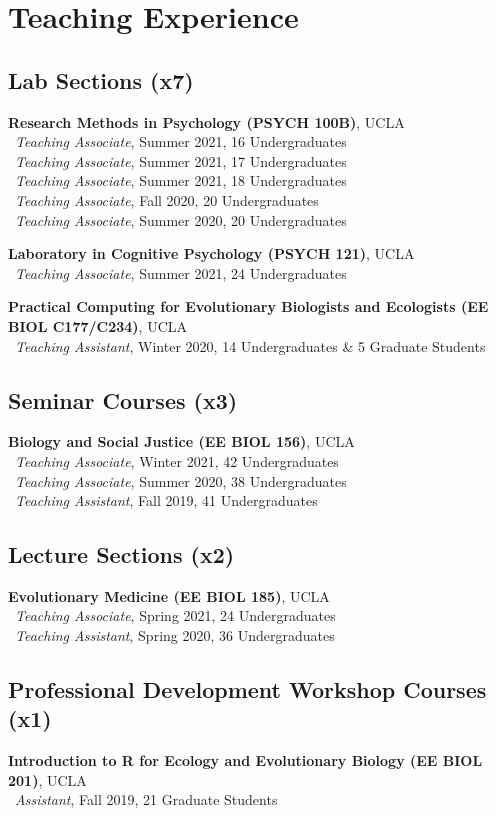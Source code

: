 \section*{Teaching Experience}
\subsection*{Lab Sections (x7)}
\textbf{Research Methods in Psychology (PSYCH 100B)}, UCLA\\
\textendash\ \textit{Teaching Associate}, Summer 2021, 16 Undergraduates\\
\textendash\ \textit{Teaching Associate}, Summer 2021, 17 Undergraduates\\
\textendash\ \textit{Teaching Associate}, Summer 2021, 18 Undergraduates\\
\textendash\ \textit{Teaching Associate}, Fall 2020, 20 Undergraduates\\
\textendash\ \textit{Teaching Associate}, Summer 2020, 20 Undergraduates

\pubspace

\textbf{Laboratory in Cognitive Psychology (PSYCH 121)}, UCLA\\
\textendash\ \textit{Teaching Associate}, Summer 2021, 24 Undergraduates

\pubspace

\textbf{Practical Computing for Evolutionary Biologists and Ecologists (EE BIOL C177/C234)}, UCLA\\
\textendash\ \textit{Teaching Assistant}, Winter 2020, 14 Undergraduates \& 5 Graduate Students

\subsection*{Seminar Courses (x3)}
\textbf{Biology and Social Justice (EE BIOL 156)}, UCLA\\
\textendash\ \textit{Teaching Associate}, Winter 2021, 42 Undergraduates\\
\textendash\ \textit{Teaching Associate}, Summer 2020, 38 Undergraduates\\
\textendash\ \textit{Teaching Assistant}, Fall 2019, 41 Undergraduates

\subsection*{Lecture Sections (x2)}
\textbf{Evolutionary Medicine (EE BIOL 185)}, UCLA\\
\textendash\ \textit{Teaching Associate}, Spring 2021, 24 Undergraduates\\
\textendash\ \textit{Teaching Assistant}, Spring 2020, 36 Undergraduates

\subsection*{Professional Development Workshop Courses (x1)}
\textbf{Introduction to R for Ecology and Evolutionary Biology (EE BIOL 201)}, UCLA\\
\textendash\ \textit{Assistant}, Fall 2019, 21 Graduate Students